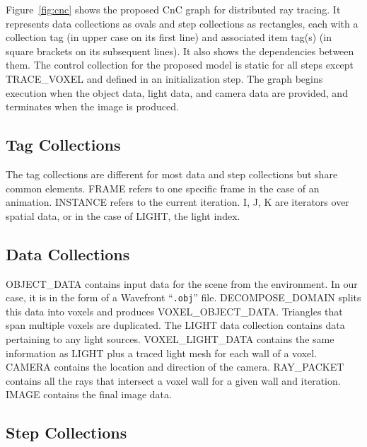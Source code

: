 \documentclass{vgtc}                          %
\begin{document}
Figure~\ref{fig:cnc} shows the proposed CnC graph for distributed ray
tracing.
It represents data collections as ovals and step collections
as rectangles, each with a collection tag
(in upper case on its first line) and associated item tag(s) (in
square brackets on its subsequent lines). It also shows the
dependencies between them. The control collection for the proposed
model is static for all steps except TRACE\_VOXEL
and defined in an initialization step. The graph begins
execution when the object data, light data, and camera data are
provided, and terminates when the image is produced.

\subsection{Tag Collections}

The tag collections are different for most data and step collections
but share common elements. FRAME refers to one specific frame in the
case of an animation. INSTANCE refers to the current iteration.
I, J, K are iterators over spatial data, or in the case of LIGHT, the
light index.

\subsection{Data Collections}


OBJECT\_DATA contains input data for the scene from the environment.
In our case, it is in the form of a Wavefront ``\texttt{.obj}'' file.
DECOMPOSE\_DOMAIN splits this data into voxels and produces
VOXEL\_OBJECT\_DATA. Triangles that span multiple voxels are
duplicated. The LIGHT data collection contains data pertaining to any
light sources. VOXEL\_LIGHT\_DATA contains the same information as
LIGHT plus a traced light mesh for each wall of a voxel. CAMERA
contains the location and direction of the camera. RAY\_PACKET
contains all the rays that intersect a voxel wall for a given wall and
iteration. IMAGE contains the final image data.

\subsection{Step Collections}
\end{document}

